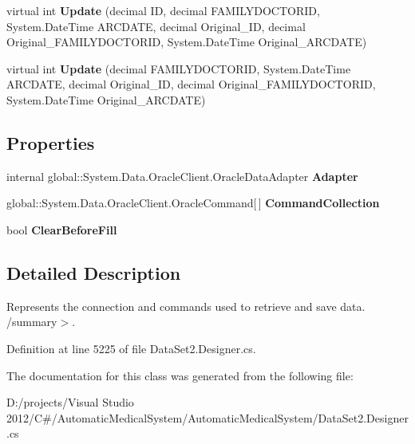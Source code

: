 \begin{CompactItemize}
\item 
virtual int \textbf{Update} (decimal ID, decimal FAMILYDOCTORID, System.DateTime ARCDATE, decimal Original\_\-ID, decimal Original\_\-FAMILYDOCTORID, System.DateTime Original\_\-ARCDATE)\label{class_automatic_medical_system_1_1_data_set2_table_adapters_1_1_a_r_c___f_a_m_i_l_y___d_o_c_t_o_r___r_e_c_o_r_d_s_table_adapter_79f7ca2f487aa8c22d7d1bb385ec779c}

\item 
virtual int \textbf{Update} (decimal FAMILYDOCTORID, System.DateTime ARCDATE, decimal Original\_\-ID, decimal Original\_\-FAMILYDOCTORID, System.DateTime Original\_\-ARCDATE)\label{class_automatic_medical_system_1_1_data_set2_table_adapters_1_1_a_r_c___f_a_m_i_l_y___d_o_c_t_o_r___r_e_c_o_r_d_s_table_adapter_7a7272a5f71dce92c9af29592be539fd}

\end{CompactItemize}
\subsection*{Properties}
\begin{CompactItemize}
\item 
internal global::System.Data.OracleClient.OracleDataAdapter \textbf{Adapter}\hspace{0.3cm}{\tt  [get]}\label{class_automatic_medical_system_1_1_data_set2_table_adapters_1_1_a_r_c___f_a_m_i_l_y___d_o_c_t_o_r___r_e_c_o_r_d_s_table_adapter_5089cc855c90f210063c96e87e4f817e}

\item 
global::System.Data.OracleClient.OracleCommand[$\,$] \textbf{CommandCollection}\hspace{0.3cm}{\tt  [get]}\label{class_automatic_medical_system_1_1_data_set2_table_adapters_1_1_a_r_c___f_a_m_i_l_y___d_o_c_t_o_r___r_e_c_o_r_d_s_table_adapter_f2f98ec25cbb0361397ec864c26ef019}

\item 
bool \textbf{ClearBeforeFill}\hspace{0.3cm}{\tt  [get, set]}\label{class_automatic_medical_system_1_1_data_set2_table_adapters_1_1_a_r_c___f_a_m_i_l_y___d_o_c_t_o_r___r_e_c_o_r_d_s_table_adapter_9ecc9f271de5d049aff588a40a8def3a}

\end{CompactItemize}


\subsection{Detailed Description}
Represents the connection and commands used to retrieve and save data. /summary$>$. 

Definition at line 5225 of file DataSet2.Designer.cs.

The documentation for this class was generated from the following file:\begin{CompactItemize}
\item 
D:/projects/Visual Studio 2012/C\#/AutomaticMedicalSystem/AutomaticMedicalSystem/DataSet2.Designer.cs\end{CompactItemize}

